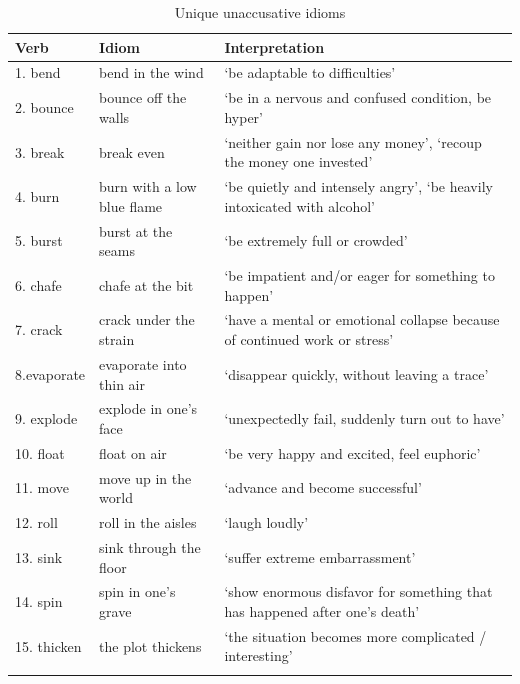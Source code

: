 \documentclass[output=paper]{langsci/langscibook}
\begin{document}
\begin{paperappendix}
\begin{table}[H]
{\smaller
\caption{Unique unaccusative idioms}
\begin{tabularx}{\textwidth}{llQ}
\lsptoprule
{Verb} & {Idiom} & {Interpretation} \\
\midrule
{1. bend}  & bend in the wind & ‘be adaptable to difficulties’\\
{2. bounce}  & bounce off the walls & ‘be in a nervous and confused condition, be hyper’\\
{3. break}  & break even & ‘neither gain nor lose any money’, ‘recoup the money one invested’\\
{4. burn}  & burn with a low blue flame & ‘be quietly and intensely angry’, ‘be heavily intoxicated with alcohol’ \\
{5. burst}  & burst at the seams & ‘be extremely full or crowded’  \\
{6. chafe}  & chafe at the bit & ‘be impatient and/or eager for something to happen’\\
{7. crack}  & crack under the strain & ‘have a mental or emotional collapse because of continued work or stress’\\
{8.evaporate} & evaporate into thin air & ‘disappear quickly, without leaving a trace’\\
{9. explode}  & explode in one’s face & ‘unexpectedly fail, suddenly turn out to have’\\
{10. float}  & float on air & ‘be very happy and excited, feel euphoric’\\
{11. move}  & move up in the world & ‘advance and become successful’ \\
{12. roll}  & roll in the aisles & ‘laugh loudly’ \\
{13. sink} & sink through the floor & ‘suffer extreme embarrassment’\\
{14. spin}  & spin in one’s grave & ‘show enormous disfavor for something that has happened after one's death’\\
{15. thicken}  & the plot thickens & ‘the situation becomes more complicated /  interesting’\\
\lspbottomrule
\end{tabularx}
}
\end{table}


\end{paperappendix}
\end{document}
